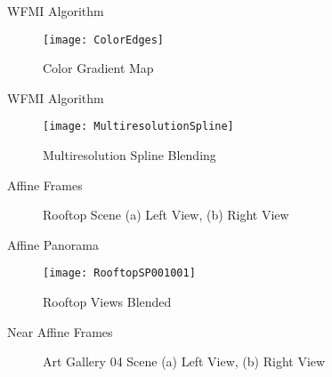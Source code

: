 \documentclass{beamer}
\begin{document}
\begin{frame}[c]{\sc WFMI Algorithm}

\begin{figure}[!h]
\centering
\texttt{[image: ColorEdges]}
\caption{Color Gradient Map \cite{Lee1991}}
\label{ArtGalleryGradient}
\end{figure}

\end{frame}


\begin{frame}[c]{\sc WFMI Algorithm}

\begin{figure}[!h]
\centering
\texttt{[image: MultiresolutionSpline]}
\caption{Multiresolution Spline Blending \cite{Burt1983}}
\label{MultiresolutionSpline}
\end{figure}

\end{frame}







\begin{frame}[c]{\sc Affine Frames}

\begin{figure}[!h]
\centering
{}
\caption{Rooftop Scene (a) Left View, (b) Right View}
\label{RooftopImages}
\end{figure}

\end{frame}

\begin{frame}[c]{\sc Affine Panorama}

\begin{figure}[!h]
\centering
\texttt{[image: RooftopSP001001]}
\caption{Rooftop Views Blended}
\label{RooftopStitched}
\end{figure}

\end{frame}


\begin{frame}[c]{\sc Near Affine Frames}

\begin{figure}[!h]
\centering
{}
\caption{Art Gallery 04 Scene (a) Left View, (b) Right View}
\label{ArtGallery4Images}
\end{figure}

\end{frame}
\end{document}
